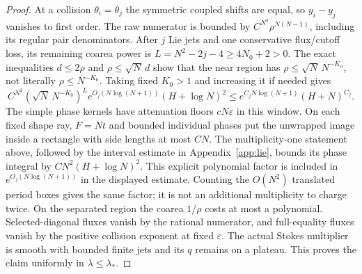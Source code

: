 \documentclass[11pt]{article}
\numberwithin{equation}{section}
\theoremstyle{definition}
\newcommand{\eps}{\varepsilon}
\begin{document}
\begin{proof}
At a collision \(\theta_i=\theta_j\) the symmetric coupled shifts
are equal, so \(y_i-y_j\) vanishes to first order. The raw numerator
is bounded by \(C^{N^2}\rho^{N(N-1)}\), including its regular pair
denominators. After \(j\) Lie jets and one conservative flux/cutoff
loss, its remaining coarea power is
\(L=N^2-2j-4\ge4N_0+2>0\).
The exact inequalities \(d\le2\rho\) and \(\rho\le\sqrt N\,d\)
show that the near region
has \(\rho\le\sqrt N\,N^{-K_0}\), not literally \(\rho\le N^{-K_0}\).
Taking fixed \(K_0>1\) and increasing it if needed gives
\[
 C^{N^2}(\sqrt N\,N^{-K_0})^L
      e^{O_j(N\log(N+1))}(H+\log N)^2
 \le e^{C_jN\log(N+1)}(H+N)^{C_j}.
\]
The simple phase kernels have attenuation floors \(cN\eps\) in
this window. On each fixed shape ray, \(F=Nt\) and bounded individual
phases put the unwrapped image inside a rectangle with side lengths
at most \(CN\). The multiplicity-one statement above, followed by
the interval estimate in Appendix~\ref{app:lie}, bounds its phase
integral by \(CN^2(H+\log N)^2\). This explicit polynomial factor
is included in \(e^{O_j(N\log(N+1))}\) in the displayed estimate.
Counting the \(O(N^2)\) translated period boxes gives the same
factor; it is not an additional multiplicity to charge twice.
On the separated region the coarea \(1/\rho\) costs at most a
polynomial.
Selected-diagonal fluxes vanish by the rational numerator, and
full-equality fluxes vanish by the positive collision exponent at
fixed \(\eps\). The actual Stokes multiplier is smooth with bounded
finite jets and its \(q\) remains on a plateau. This proves the
claim uniformly in \(\lambda\le\lambda_*\).
\end{proof}
\end{document}

